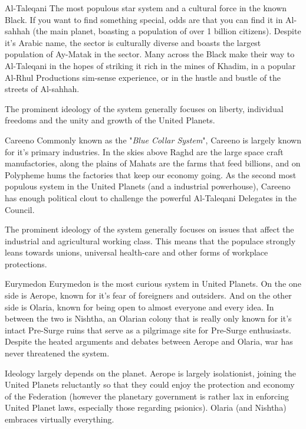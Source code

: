 \begin{multicols}{2}
  \begin{genericsection}{Al-Taleqani}
  The most populous star system and a cultural force in the known Black. If you want to find something special, odds are that you can find it in Al-sahhah (the main planet, boasting a population of over 1 billion citizens). Despite it's Arabic name, the sector is culturally diverse and boasts the largest population of Ay-Matak in the sector. Many across the Black make their way to Al-Taleqani in the hopes of striking it rich in the mines of Khadim, in a popular Al-Rhul Productions sim-sense experience, or in the hustle and bustle of the streets of Al-sahhah.
  
  The prominent ideology of the system generally focuses on liberty, individual freedoms and the unity and growth of the United Planets.
  \end{genericsection}
  
  \begin{genericsection}{Careeno}
  Commonly known as the "\textit{Blue Collar System}", Careeno is largely known for it's primary industries. In the skies above Raghd are the large space craft manufactories, along the plains of Mahats are the farms that feed billions, and on Polypheme hums the factories that keep our economy going. As the second most populous system in the United Planets (and a industrial powerhouse), Careeno has enough political clout to challenge the powerful Al-Taleqani Delegates in the Council.
  
  The prominent ideology of the system generally focuses on issues that affect the industrial and agricultural working class. This means that the populace strongly leans towards unions, universal health-care and other forms of workplace protections.
  \end{genericsection}
  
  \begin{genericsection}{Eurymedon}
  Eurymedon is the most curious system in United Planets. On the one side is Aerope, known for it's fear of foreigners and outsiders. And on the other side is Olaria, known for being open to almost everyone and every idea. In between the two is Nishtha, an Olarian colony that is really only known for it's intact Pre-Surge ruins that serve as a pilgrimage site for Pre-Surge enthusiasts. Despite the heated arguments and debates between Aerope and Olaria, war has never threatened the system.
  
  Ideology largely depends on the planet. Aerope is largely isolationist, joining the United Planets reluctantly so that they could enjoy the protection and economy of the Federation (however the planetary government is rather lax in enforcing United Planet laws, especially those regarding psionics). Olaria (and Nishtha) embraces virtually everything.
  \end{genericsection}
  

\end{multicols}
